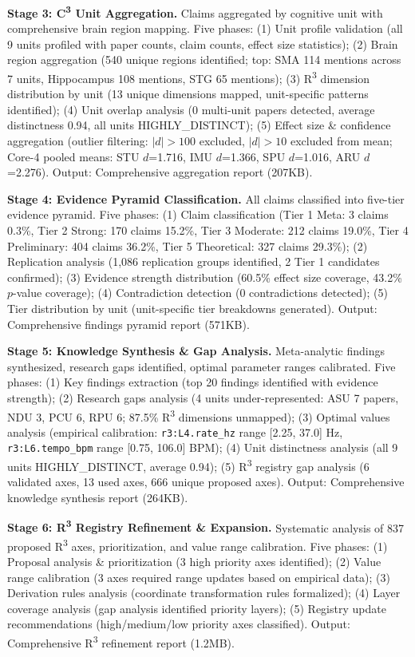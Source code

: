 \documentclass[9pt,onecolumn]{article}
\begin{document}
\textbf{Stage 3: C\textsuperscript{3} Unit Aggregation.} Claims aggregated by cognitive unit with comprehensive brain region mapping. Five phases: (1) Unit profile validation (all 9 units profiled with paper counts, claim counts, effect size statistics); (2) Brain region aggregation (540 unique regions identified; top: SMA 114 mentions across 7 units, Hippocampus 108 mentions, STG 65 mentions); (3) R\textsuperscript{3} dimension distribution by unit (13 unique dimensions mapped, unit-specific patterns identified); (4) Unit overlap analysis (0 multi-unit papers detected, average distinctness 0.94, all units HIGHLY\_DISTINCT); (5) Effect size \& confidence aggregation (outlier filtering: $|d| > 100$ excluded, $|d| > 10$ excluded from mean; Core-4 pooled means: STU $d$=1.716, IMU $d$=1.366, SPU $d$=1.016, ARU $d$=2.276). Output: Comprehensive aggregation report (207KB).

\textbf{Stage 4: Evidence Pyramid Classification.} All claims classified into five-tier evidence pyramid. Five phases: (1) Claim classification (Tier 1 Meta: 3 claims 0.3\%, Tier 2 Strong: 170 claims 15.2\%, Tier 3 Moderate: 212 claims 19.0\%, Tier 4 Preliminary: 404 claims 36.2\%, Tier 5 Theoretical: 327 claims 29.3\%); (2) Replication analysis (1,086 replication groups identified, 2 Tier 1 candidates confirmed); (3) Evidence strength distribution (60.5\% effect size coverage, 43.2\% $p$-value coverage); (4) Contradiction detection (0 contradictions detected); (5) Tier distribution by unit (unit-specific tier breakdowns generated). Output: Comprehensive findings pyramid report (571KB).

\textbf{Stage 5: Knowledge Synthesis \& Gap Analysis.} Meta-analytic findings synthesized, research gaps identified, optimal parameter ranges calibrated. Five phases: (1) Key findings extraction (top 20 findings identified with evidence strength); (2) Research gaps analysis (4 units under-represented: ASU 7 papers, NDU 3, PCU 6, RPU 6; 87.5\% R\textsuperscript{3} dimensions unmapped); (3) Optimal values analysis (empirical calibration: \texttt{r3:L4.rate\_hz} range [2.25, 37.0] Hz, \texttt{r3:L6.tempo\_bpm} range [0.75, 106.0] BPM); (4) Unit distinctness analysis (all 9 units HIGHLY\_DISTINCT, average 0.94); (5) R\textsuperscript{3} registry gap analysis (6 validated axes, 13 used axes, 666 unique proposed axes). Output: Comprehensive knowledge synthesis report (264KB).

\textbf{Stage 6: R\textsuperscript{3} Registry Refinement \& Expansion.} Systematic analysis of 837 proposed R\textsuperscript{3} axes, prioritization, and value range calibration. Five phases: (1) Proposal analysis \& prioritization (3 high priority axes identified); (2) Value range calibration (3 axes required range updates based on empirical data); (3) Derivation rules analysis (coordinate transformation rules formalized); (4) Layer coverage analysis (gap analysis identified priority layers); (5) Registry update recommendations (high/medium/low priority axes classified). Output: Comprehensive R\textsuperscript{3} refinement report (1.2MB).
\end{document}
